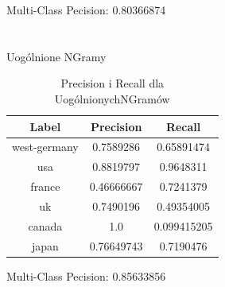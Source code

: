 \documentclass{classrep}
\begin{document}
Multi-Class Pecision: 0.80366874\\
\\
\\
Uogólnione NGramy
\begin{table}[H]
\begin{tabular}{|c|c|c|}
\hline
Label        & Precision  & Recall      \\ \hline
west-germany & 0.7589286  & 0.65891474  \\ \hline
usa          & 0.8819797  & 0.9648311   \\ \hline
france       & 0.46666667 & 0.7241379   \\ \hline
uk           & 0.7490196  & 0.49354005  \\ \hline
canada       & 1.0        & 0.099415205 \\ \hline
japan        & 0.76649743 & 0.7190476   \\ \hline
\end{tabular}
\caption{Precision i Recall dla UogólnionychNGramów}
\end{table}
Multi-Class Pecision: 0.85633856
\end{document}
